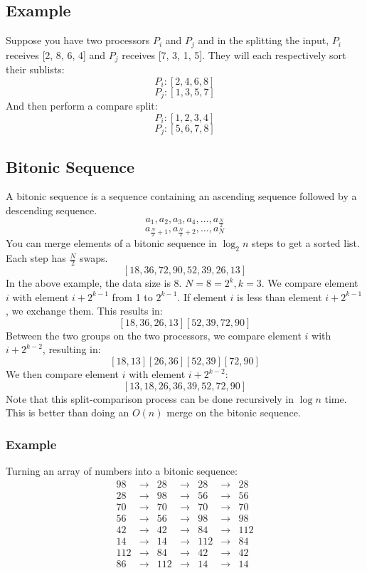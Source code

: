 \documentclass[letterpaper, 12pt]{math}
\begin{document}
\subsection*{Example}
Suppose you have two processors \( P_i \) and \( P_j \) and in the splitting
the input, \( P_i \) receives [2, 8, 6, 4] and \( P_j \) receives [7, 3, 1, 5].
They will each respectively sort their sublists:
\[ P_i: [2, 4, 6, 8] \]
\[ P_j: [1, 3, 5, 7] \]
And then perform a compare split:
\[ P_i: [1, 2, 3, 4] \]
\[ P_j: [5, 6, 7, 8] \]

\subsection*{Bitonic Sequence}
A bitonic sequence is a sequence containing an ascending sequence followed by a
descending sequence.
\[ a_1,a_2,a_3,a_4,\dots,a_{\frac{N}{2}} \]
\[ a_{\frac{N}{2}+1},a_{\frac{N}{2}+2},\dots,a_{N} \]
You can merge elements of a bitonic sequence in \( \log_2 n \) steps to get a
sorted list. Each step has \( \frac{N}{2} \) swaps.
\[ [18,36,72,90,52,39,26,13] \]
In the above example, the data size is 8. \( N = 8 = 2^k, k = 3 \). We compare
element \( i \) with element \( i+2^{k-1} \) from 1 to \( 2^{k-1} \).
If element \( i \) is less than element \( i+2^{k-1} \), we exchange them.
This results in:
\[ [18,36,26,13] [52,39,72,90] \]
Between the two groups on the two processors, we compare element \( i \) with
\( i+2^{k-2} \), resulting in:
\[ [18,13] [26,36] [52,39] [72,90] \]
We then compare element \( i \) with element \(i+2^{k-2} \):
\[ [13,18,26,36,39,52,72,90] \]
Note that this split-comparison process can be done recursively in \( \log n \)
time. This is better than doing an \( O(n) \) merge on the bitonic sequence.

\subsubsection*{Example}
Turning an array of numbers into a bitonic sequence:
\[ \begin{array}{lclclcl}
  98  & \to & 28  & \to & 28  & \to & 28  \\
  28  & \to & 98  & \to & 56  & \to & 56  \\
  70  & \to & 70  & \to & 70  & \to & 70  \\
  56  & \to & 56  & \to & 98  & \to & 98  \\
  42  & \to & 42  & \to & 84  & \to & 112 \\
  14  & \to & 14  & \to & 112 & \to & 84  \\
  112 & \to & 84  & \to & 42  & \to & 42  \\
  86  & \to & 112 & \to & 14  & \to & 14  \\
\end{array} \]
\end{document}
